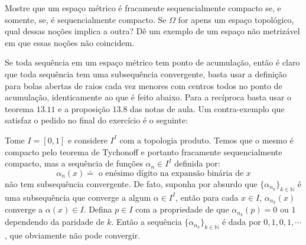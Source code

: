 \begin{Mybox}
Mostre que um espaço métrico é fracamente sequencialmente compacto se, e somente, se, é sequencialmente compacto. Se $\Omega$ for apens um espaço topológico, qual dessas noções implica a outra? Dê um exemplo de um espaço não metrizável em que essas noções não coincidem.
\vspace{-.4cm}
\end{Mybox}
\vspace{-.5cm}
\begin{dem}
Se toda sequência em um espaço métrico tem ponto de acumulação, então é claro que toda sequência tem uma subsequência convergente, basta usar a definição para bolas abertas de raios cada vez menores com centros todos no ponto de acumulação, identicamente ao que é feito abaixo. Para a recíproca basta usar o teorema $13.11$ e a proposição $13.8$ das notas de aula. Um contra-exemplo que satisfaz o pedido no final do exercício é o seguinte:\par
    Tome $I = [0,1]$ e considere $I^I$ com a topologia produto. Temos que o mesmo é compacto pelo teorema de Tychonoff e portanto fracamente sequencialmente compacto, mas a sequência de funções $\alpha_n \in I^I$ definida por: $$\alpha_n(x) \doteq \text{ o enésimo dígito na expansão binária de $x$}$$ não tem subsequência convergente. De fato, suponha por absurdo que $\{\alpha_{n_k} \}_{k \in \mathbb{N}}$ é uma subsequência que converge a algum $\alpha \in I^I$, então para cada $x \in I$,  $\alpha_{n_k}(x)$ converge a $\alpha(x) \in I$. Defina $p \in I$ com a propriedade de que $\alpha_{n_k}(p) = 0 \text{ ou }1$ dependendo da paridade de $k$. Então a sequência $\{\alpha_{n_k} \}_{k \in \mathbb{N}}$ é dada por $0, 1, 0, 1, \cdots$, que obviamente não pode convergir.
    

\end{dem}
